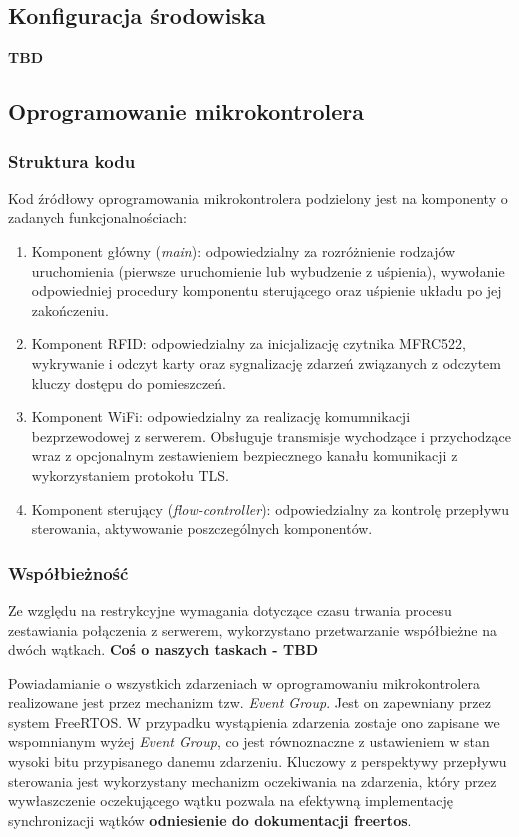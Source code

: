         \subsection{Konfiguracja środowiska}
            \textbf{TBD}

        \subsection{Oprogramowanie mikrokontrolera}

            \subsubsection{Struktura kodu}
                Kod źródłowy oprogramowania mikrokontrolera podzielony jest na komponenty o zadanych funkcjonalnościach:
                \begin{enumerate}
                    \item Komponent główny (\textit{main}): odpowiedzialny za rozróżnienie rodzajów uruchomienia (pierwsze uruchomienie lub wybudzenie z uśpienia), wywołanie odpowiedniej procedury komponentu sterującego oraz uśpienie układu po jej zakończeniu.
                    \item Komponent RFID: odpowiedzialny za inicjalizację czytnika MFRC522, wykrywanie i odczyt karty oraz sygnalizację zdarzeń związanych z odczytem kluczy dostępu do pomieszczeń.
                    \item Komponent WiFi: odpowiedzialny za realizację komumnikacji bezprzewodowej z serwerem. Obsługuje transmisje wychodzące i przychodzące wraz z opcjonalnym zestawieniem bezpiecznego kanału komunikacji z wykorzystaniem protokołu TLS.
                    \item Komponent sterujący (\textit{flow-controller}): odpowiedzialny za kontrolę przepływu sterowania, aktywowanie poszczególnych komponentów.
                \end{enumerate}

            \subsubsection{Współbieżność}
                Ze względu na restrykcyjne wymagania dotyczące czasu trwania procesu zestawiania połączenia z serwerem, wykorzystano przetwarzanie współbieżne na dwóch wątkach.
                \textbf{Coś o naszych taskach - TBD}

                Powiadamianie o wszystkich zdarzeniach w oprogramowaniu mikrokontrolera realizowane jest przez mechanizm tzw. \textit{Event Group}. Jest on zapewniany przez system FreeRTOS. W przypadku wystąpienia zdarzenia zostaje ono zapisane we wspomnianym wyżej \textit{Event Group}, co jest równoznaczne z ustawieniem w stan wysoki bitu przypisanego danemu zdarzeniu. Kluczowy z perspektywy przepływu sterowania jest wykorzystany mechanizm oczekiwania na zdarzenia, który przez wywłaszczenie oczekującego wątku pozwala na efektywną implementację synchronizacji wątków \textbf{odniesienie do dokumentacji freertos}.


